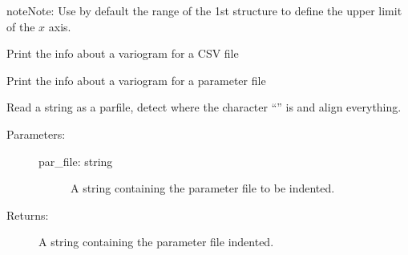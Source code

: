 \documentclass[letterpaper,10pt,english]{sphinxmanual}
\begin{document}
\begin{fulllineitems}
\begin{fulllineitems}
\begin{description}
\end{description}

\begin{sphinxadmonition}{note}{Note:}
Use by default the range of the 1st structure to define the 
upper limit of the \(x\) axis.
\end{sphinxadmonition}

\end{fulllineitems}


\begin{fulllineitems}
\label{\detokenize{appendices:s2Dcd.gslibnumpy.Variogram.print4csv}}
Print the info about a variogram for a CSV file

\end{fulllineitems}


\begin{fulllineitems}
\label{\detokenize{appendices:s2Dcd.gslibnumpy.Variogram.print4par}}
Print the info about a variogram for a parameter file

\end{fulllineitems}


\end{fulllineitems}


\begin{fulllineitems}
\label{\detokenize{appendices:s2Dcd.gslibnumpy.align_parfile}}
Read a string as a parfile, detect where the character “” is and
align everything.
\begin{description}
\item[{Parameters:}] \leavevmode\begin{description}
\item[{par\_file: string}] \leavevmode
A string containing the parameter file to be indented.

\end{description}

\item[{Returns:}] \leavevmode
A string containing the parameter file indented.

\end{description}

\end{fulllineitems}
\end{document}
